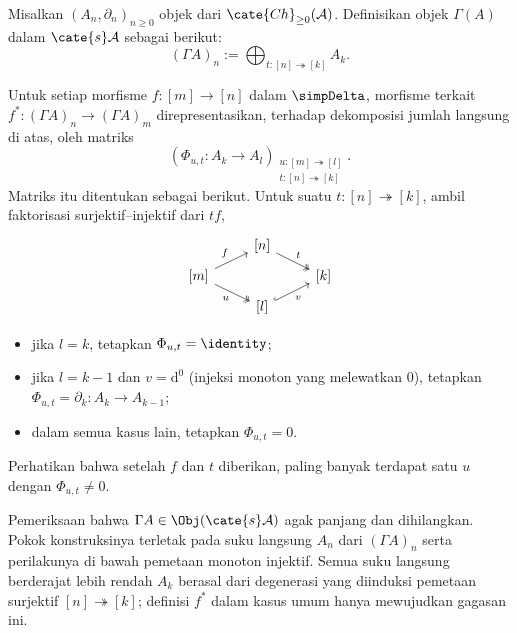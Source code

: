 \begin{definition}\label{def:DK-Gamma}
	Misalkan $(A_n,\partial_n)_{n\geq0}$ objek dari
	$\cate{Ch}_{\geq0}(\mathcal{A})$. Definisikan objek
	$\Gamma(A)$ dalam $\cate{s}\mathcal{A}$ sebagai berikut:
	\[ (\Gamma A)_n := \bigoplus_{t: [n] \twoheadrightarrow [k]} A_k. \]

	Untuk setiap morfisme $f:[m]\to[n]$ dalam $\simpDelta$, morfisme terkait
	$f^*:(\Gamma A)_n\to(\Gamma A)_m$ direpresentasikan, terhadap dekomposisi
	jumlah langsung di atas, oleh matriks
	\[ \left( \Phi_{u, t} : A_k \to A_l \right)_{\substack{ u: [m] \twoheadrightarrow [l] \\ t: [n] \twoheadrightarrow [k] }}. \]
	Matriks itu ditentukan sebagai berikut. Untuk suatu
	$t:[n]\twoheadrightarrow[k]$, ambil faktorisasi surjektif--injektif dari
	$tf$,
	\begin{equation}\label{eqn:Dold-Kan-epi-mono}\begin{tikzcd}[row sep=tiny]
		& {[n]} \arrow[twoheadrightarrow, rd, "t"] & \\
		{[m]} \arrow[ru, "f"] \arrow[twoheadrightarrow, rd, "u"'] & & {[k]} \\
		& {[l]} \arrow[hookrightarrow, ru, "v"'] &
	\end{tikzcd}\end{equation}
	\begin{itemize}
		\item jika $l=k$, tetapkan $\Phi_{u,t}=\identity$;
		\item jika $l=k-1$ dan $v=\mathrm{d}^0$ (injeksi monoton yang
		melewatkan $0$), tetapkan
		$\Phi_{u,t}=\partial_k:A_k\to A_{k-1}$;
		\item dalam semua kasus lain, tetapkan $\Phi_{u,t}=0$.
	\end{itemize}
	Perhatikan bahwa setelah $f$ dan $t$ diberikan, paling banyak terdapat satu
	$u$ dengan $\Phi_{u,t}\neq0$.
\end{definition}

Pemeriksaan bahwa $\Gamma A\in\Obj(\cate{s}\mathcal{A})$ agak panjang dan
dihilangkan. Pokok konstruksinya terletak pada suku langsung $A_n$ dari $(\Gamma A)_n$ serta
perilakunya di bawah pemetaan monoton injektif. Semua suku langsung
berderajat lebih rendah $A_k$ berasal dari degenerasi yang diinduksi pemetaan
surjektif $[n]\twoheadrightarrow[k]$; definisi $f^*$ dalam kasus umum hanya
mewujudkan gagasan ini.

